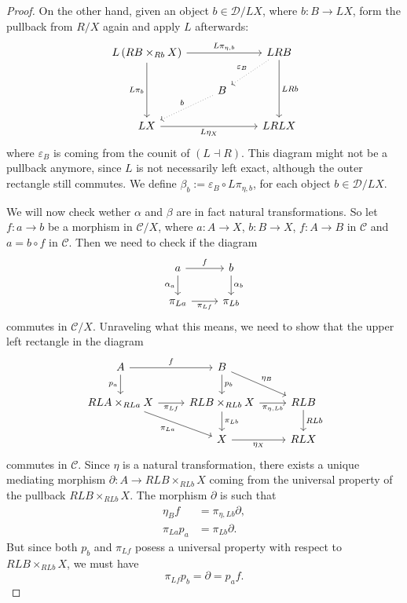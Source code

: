 \begin{proof}
On the other hand, given an object $b \in \mathcal{D}/LX$, where $b : B \to LX$, form the pullback from $R/X$ again and apply $L$ afterwards:
\[\begin{tikzcd}
L\left(RB \times_{Rb} X\right) \arrow[rr, "L \pi_{\eta,b}"] \arrow[dd, swap, "L\pi_b"] & & LRB \arrow[dd, "LRb"] \arrow[dl, dotted, swap, "\varepsilon_B"] \\
 & B \arrow[dl, dotted, swap, "b"] & \\
LX \arrow[rr, swap, "L\eta_X"] & & LRLX
\end{tikzcd}\]
where $\varepsilon_B$ is coming from the counit of $(L \dashv R)$. 
This diagram might not be a pullback anymore, since $L$ is not necessarily left exact, although the outer rectangle still commutes. We define $\beta_b := \varepsilon_B \circ L\pi_{\eta,b}$, for each object $b \in \mathcal{D}/LX$.

We will now check wether $\alpha$ and $\beta$ are in fact natural transformations.
So let $f : a \to b$ be a morphism in $\mathcal{C}/X$, where $a : A \to X$, $b : B \to X$, $f : A \to B$ in $\mathcal{C}$ and $a = b \circ f$ in $\mathcal{C}$. Then we need to check if the diagram
\[\begin{tikzcd}
a \arrow[r, "f"] \arrow[d, swap, "\alpha_a"] & b \arrow[d, "\alpha_b"] \\
\pi_{La} \arrow[r, swap, "\pi_{Lf}"] & \pi_{Lb}
\end{tikzcd}\]
commutes in $\mathcal{C}/X$.
Unraveling what this means, we need to show that the upper left rectangle in the diagram
\[\begin{tikzcd}
A \arrow[r, "f"] \arrow[d, swap, "p_a"] & B \arrow[d, "p_b"] \arrow[dr, "\eta_B"] \\
RLA \times_{RLa} X \arrow[r, swap, "\pi_{Lf}"] \arrow[dr, swap, "\pi_{La}"] & RLB \times_{RLb} X \arrow[d, "\pi_{Lb}"] \arrow[r, swap, "\pi_{\eta,Lb}"] & RLB \arrow[d, "RLb"] \\
& X \arrow[r, swap, "\eta_X"] & RLX
\end{tikzcd}\]
commutes in $\mathcal{C}$. Since $\eta$ is a natural transformation, there exists a unique mediating morphism $\partial : A \to RLB \times_{RLb} X$ coming from the universal property of the pullback $RLB \times_{RLb} X$.
The morphism $\partial$ is such that
\begin{align*}
\eta_B f &= \pi_{\eta,Lb} \partial, \\
\pi_{La} p_a &= \pi_{Lb} \partial.
\end{align*}
But since both $p_b$ and $\pi_{Lf}$ posess a universal property with respect to $RLB \times_{RLb} X$, we must have
\[ \pi_{Lf} p_b = \partial = p_a f. \]


\end{proof}
